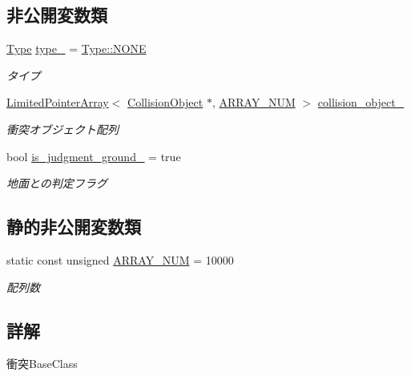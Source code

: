 \subsection*{非公開変数類}
\begin{DoxyCompactItemize}
\item 
\mbox{\hyperlink{class_collision_base_a18dc0d5461742083ca12013fe9ff1a20}{Type}} \mbox{\hyperlink{class_collision_base_a254487778b15b900d763ebf0bf153c3e}{type\+\_\+}} = \mbox{\hyperlink{class_collision_base_a18dc0d5461742083ca12013fe9ff1a20ab50339a10e1de285ac99d4c3990b8693}{Type\+::\+N\+O\+NE}}
\begin{DoxyCompactList}\small\item\em タイプ \end{DoxyCompactList}\item 
\mbox{\hyperlink{class_limited_pointer_array}{Limited\+Pointer\+Array}}$<$ \mbox{\hyperlink{class_collision_object}{Collision\+Object}} $\ast$, \mbox{\hyperlink{class_collision_base_a0ddcdd5ed993b19c6edabd9c50e76ba4}{A\+R\+R\+A\+Y\+\_\+\+N\+UM}} $>$ \mbox{\hyperlink{class_collision_base_af12edcd99a26ac7636cc6f6b59feca81}{collision\+\_\+object\+\_\+}}
\begin{DoxyCompactList}\small\item\em 衝突オブジェクト配列 \end{DoxyCompactList}\item 
bool \mbox{\hyperlink{class_collision_base_acc56eed7a6366d77bb2b80810f0a4ea7}{is\+\_\+judgment\+\_\+ground\+\_\+}} = true
\begin{DoxyCompactList}\small\item\em 地面との判定フラグ \end{DoxyCompactList}\end{DoxyCompactItemize}
\subsection*{静的非公開変数類}
\begin{DoxyCompactItemize}
\item 
static const unsigned \mbox{\hyperlink{class_collision_base_a0ddcdd5ed993b19c6edabd9c50e76ba4}{A\+R\+R\+A\+Y\+\_\+\+N\+UM}} = 10000
\begin{DoxyCompactList}\small\item\em 配列数 \end{DoxyCompactList}\end{DoxyCompactItemize}


\subsection{詳解}
衝突\+Base\+Class 

